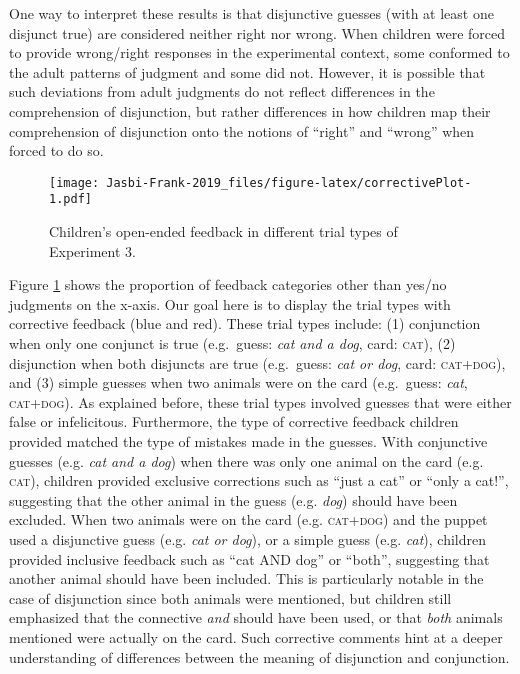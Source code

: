 \documentclass[,man,floatsintext]{apa6}
\begin{document}
One way to interpret these results is that disjunctive guesses (with at least one disjunct true) are considered neither right nor wrong. When children were forced to provide wrong/right responses in the experimental context, some conformed to the adult patterns of judgment and some did not. However, it is possible that such deviations from adult judgments do not reflect differences in the comprehension of disjunction, but rather differences in how children map their comprehension of disjunction onto the notions of \enquote{right} and \enquote{wrong} when forced to do so.

\begin{figure}
\centering
\texttt{[image: Jasbi-Frank-2019\_files/figure-latex/correctivePlot-1.pdf]}
\caption{\label{fig:correctivePlot}Children's open-ended feedback in different trial types of Experiment 3.}
\end{figure}

Figure \ref{fig:correctivePlot} shows the proportion of feedback categories other than yes/no judgments on the x-axis. Our goal here is to display the trial types with corrective feedback (blue and red). These trial types include: (1) conjunction when only one conjunct is true (e.g.~guess: \emph{cat and a dog}, card: \textsc{cat}), (2) disjunction when both disjuncts are true (e.g.~guess: \emph{cat or dog}, card: \textsc{cat+dog}), and (3) simple guesses when two animals were on the card (e.g.~guess: \emph{cat}, \textsc{cat+dog}). As explained before, these trial types involved guesses that were either false or infelicitous. Furthermore, the type of corrective feedback children provided matched the type of mistakes made in the guesses. With conjunctive guesses (e.g. \emph{cat and a dog}) when there was only one animal on the card (e.g. \textsc{cat}), children provided exclusive corrections such as \enquote{just a cat} or \enquote{only a cat!}, suggesting that the other animal in the guess (e.g. \emph{dog}) should have been excluded. When two animals were on the card (e.g. \textsc{cat+dog}) and the puppet used a disjunctive guess (e.g. \emph{cat or dog}), or a simple guess (e.g. \emph{cat}), children provided inclusive feedback such as \enquote{cat AND dog} or \enquote{both}, suggesting that another animal should have been included. This is particularly notable in the case of disjunction since both animals were mentioned, but children still emphasized that the connective \emph{and} should have been used, or that \emph{both} animals mentioned were actually on the card. Such corrective comments hint at a deeper understanding of differences between the meaning of disjunction and conjunction.
\end{document}

